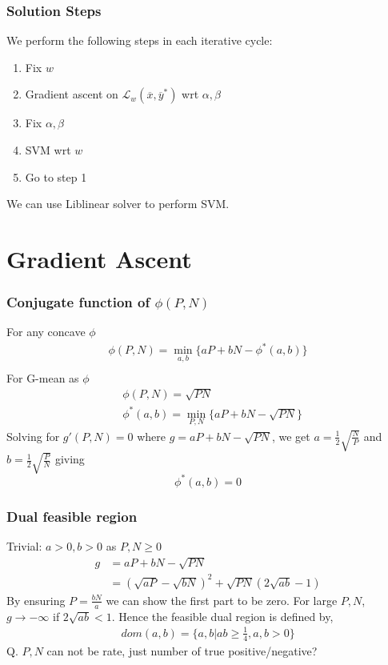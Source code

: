\documentclass{beamer}
\begin{document}
\begin{frame}
	\frametitle{Solution Steps}
	We perform the following steps in each iterative cycle:
	\begin{enumerate}
	\item Fix $w$
	\item Gradient ascent on $\mathcal L_w(\overline{x},\overline{y}^*)$ wrt $\alpha,\beta$
	\item Fix $\alpha,\beta$
	\item SVM wrt $w$
	\item Go to step 1
	\end{enumerate}
	We can use Liblinear solver to perform SVM.
\end{frame}

\section{Gradient Ascent}
\begin{frame}
	\frametitle{Conjugate function of $\phi(P,N)$}
	For any concave $\phi$
	\begin{align*}
	\phi(P,N) = \min_{a,b}\{aP+bN-\phi^*(a,b)\}\\
	\end{align*}
	For G-mean as $\phi$
	\begin{align*}
	&\phi(P,N)=\sqrt{PN}\\
	&\phi^*(a,b) = \min_{P,N}\{aP+bN-\sqrt{PN}\}
	\end{align*}	
	Solving for $g'(P,N)=0$ where $g=aP+bN-\sqrt{PN}$, we get $a=\frac{1}{2}\sqrt{\frac{N}{P}}$ and $b=\frac{1}{2}\sqrt{\frac{P}{N}}$ giving
	\begin{equation}
	\phi^*(a,b)=0
	\end{equation}
\end{frame}
\begin{frame}
	\frametitle{Dual feasible region}
	Trivial: $a > 0,b > 0$ as $P,N \geq 0$
	\begin{align*}
	g &= aP+bN-\sqrt{PN}\\
	&=(\sqrt{aP}-\sqrt{bN})^2+\sqrt{PN}(2\sqrt{ab}-1)
	\end{align*}
	By ensuring $P=\frac{bN}{a}$ we can show the first part to be zero. For large $P,N$, $g \to -\infty$  if $2\sqrt{ab}<1$. Hence the feasible dual region is defined by,
	\begin{align*}
	dom(a,b) = \{a,b|ab \geq \frac{1}{4},a,b > 0\}
	\end{align*}
	Q. $P,N$ can not be rate, just number of true positive/negative?
\end{frame}
\end{document}

